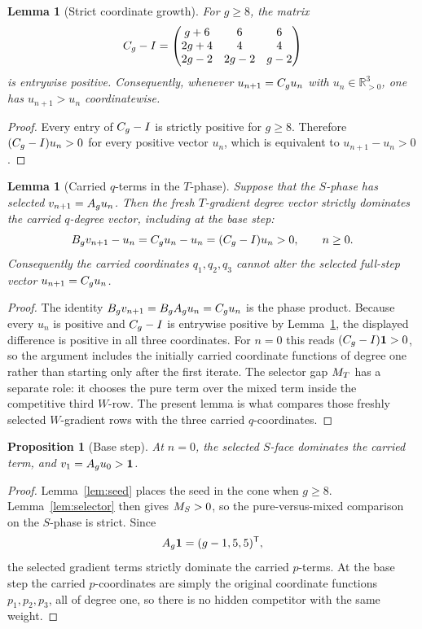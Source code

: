 \documentclass[11pt]{article}
\newtheorem{lemma}[theorem]{Lemma}
\newtheorem{proposition}[theorem]{Proposition}
\theoremstyle{remark}
\numberwithin{equation}{section}
\begin{document}
\begin{lemma}[Strict coordinate growth]\label{lem:monotone}
For \(g\geq 8\), the matrix
\[
C_g-I=
\begin{pmatrix}
g+6&6&6\\
2g+4&4&4\\
2g-2&2g-2&g-2
\end{pmatrix}
\]
is entrywise positive.  Consequently, whenever \(u_{n+1}=C_g u_n\) with
\(u_n\in\mathbb R_{>0}^3\), one has \(u_{n+1}>u_n\) coordinatewise.
\end{lemma}

\begin{proof}
Every entry of \(C_g-I\) is strictly positive for \(g\geq 8\).  Therefore
\((C_g-I)u_n>0\) for every positive vector \(u_n\), which is equivalent to
\(u_{n+1}-u_n>0\).
\end{proof}

\begin{lemma}[Carried \(q\)-terms in the \(T\)-phase]\label{lem:T-carry}
Suppose that the \(S\)-phase has selected
\(v_{n+1}=A_g u_n\).  Then the fresh \(T\)-gradient degree vector strictly
dominates the carried \(q\)-degree vector, including at the base step:
\[
 B_g v_{n+1}-u_n
 =C_g u_n-u_n
 =(C_g-I)u_n>0,
 \qquad n\geq 0.
\]
Consequently the carried coordinates \(q_1,q_2,q_3\) cannot alter the
selected full-step vector \(u_{n+1}=C_g u_n\).
\end{lemma}

\begin{proof}
The identity \(B_g v_{n+1}=B_gA_g u_n=C_g u_n\) is the phase product.
Because every \(u_n\) is positive and \(C_g-I\) is entrywise positive by
Lemma~\ref{lem:monotone}, the displayed difference is positive in all three
coordinates.  For \(n=0\) this reads
\((C_g-I)\mathbf{1}>0\), so the argument includes the initially carried coordinate
functions of degree one rather than starting only after the first iterate.
The selector gap \(M_T\) has a separate role: it chooses the pure term over
the mixed term inside the competitive third \(W\)-row.  The present lemma is
what compares those freshly selected \(W\)-gradient rows with the three
carried \(q\)-coordinates.
\end{proof}

\begin{proposition}[Base step]\label{prop:base}
At \(n=0\), the selected \(S\)-face dominates the carried term, and
\(v_1=A_g u_0>\mathbf{1}\).
\end{proposition}

\begin{proof}
Lemma~\ref{lem:seed} places the seed in the cone when \(g\geq 8\).
Lemma~\ref{lem:selector} then gives \(M_S>0\), so the pure-versus-mixed
comparison on the \(S\)-phase is strict.  Since
\[
A_g\mathbf{1}=(g-1,5,5)^{\mathsf T},
\]
the selected gradient terms strictly dominate the carried \(p\)-terms.  At the
base step the carried \(p\)-coordinates are simply the original coordinate
functions \(p_1,p_2,p_3\), all of degree one, so there is no hidden competitor
with the same weight.
\end{proof}
\end{document}
